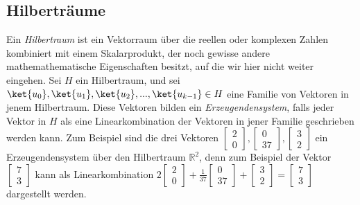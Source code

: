 \subsection{Hilberträume}
Ein \textit{Hilbertraum} ist ein Vektorraum über die reellen oder komplexen Zahlen kombiniert mit einem Skalarprodukt, der noch gewisse andere mathemathematische Eigenschaften besitzt, auf die wir hier nicht weiter eingehen. Sei $H$ ein Hilbertraum, und sei $\ket{u_0}, \ket{u_1}, \ket{u_2}, ..., \ket{u_{k - 1}} \in H$ eine Familie von Vektoren in jenem Hilbertraum. Diese Vektoren bilden ein \textit{Erzeugendensystem}, falls jeder Vektor in $H$ als eine Linearkombination der Vektoren in jener Familie geschrieben werden kann. Zum Beispiel sind die drei Vektoren $\begin{bmatrix}2 \\ 0\end{bmatrix}, \begin{bmatrix} 0 \\ 37\end{bmatrix}, \begin{bmatrix}3 \\ 2\end{bmatrix}$ ein Erzeugendensystem über den Hilbertraum $\mathbb{R}^2$, denn zum Beispiel der Vektor $\begin{bmatrix}7 \\ 3\end{bmatrix}$ kann als Linearkombination $2\begin{bmatrix}2 \\ 0\end{bmatrix} + \frac{1}{37}\begin{bmatrix} 0 \\ 37\end{bmatrix} + \begin{bmatrix}3 \\ 2\end{bmatrix} = \begin{bmatrix}7 \\ 3\end{bmatrix}$ dargestellt werden.

